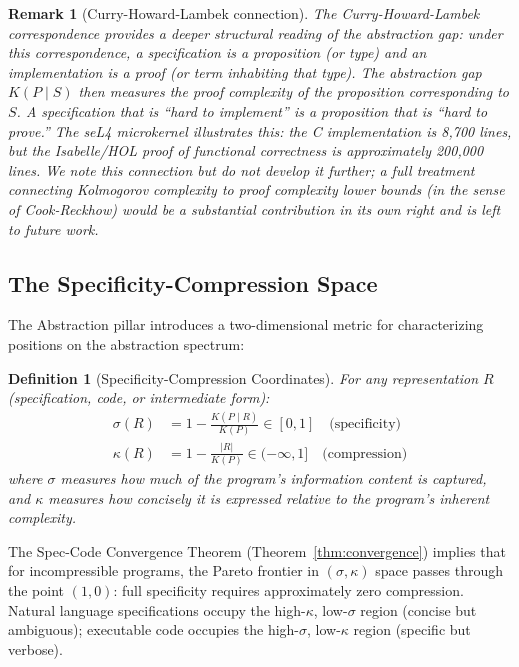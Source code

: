 \documentclass[11pt, a4paper]{googledeepmind}
\newtheorem{definition}{Definition}[section]
\newtheorem*{remark}{Remark}
\begin{document}
\begin{remark}[Curry-Howard-Lambek connection]
The Curry-Howard-Lambek correspondence \citep{martinlof1979constructive, wadler2015propositions, lambek1986higher} provides a deeper structural reading of the abstraction gap: under this correspondence, a specification is a proposition (or type) and an implementation is a proof (or term inhabiting that type). The abstraction gap $K(P \mid S)$ then measures the proof complexity of the proposition corresponding to $S$. A specification that is ``hard to implement'' is a proposition that is ``hard to prove.'' The seL4 microkernel illustrates this: the C implementation is 8,700 lines, but the Isabelle/HOL proof of functional correctness is approximately 200,000 lines. We note this connection but do not develop it further; a full treatment connecting Kolmogorov complexity to proof complexity lower bounds (in the sense of Cook-Reckhow) would be a substantial contribution in its own right and is left to future work.
\end{remark}

\subsection{The Specificity-Compression Space}

The Abstraction pillar introduces a two-dimensional metric for characterizing positions on the abstraction spectrum:

\begin{definition}[Specificity-Compression Coordinates]
\label{def:sigma-kappa}
For any representation $R$ (specification, code, or intermediate form):
\begin{align}
    \sigma(R) &= 1 - \frac{K(P \mid R)}{K(P)} \in [0, 1] \quad \text{(specificity)} \\
    \kappa(R) &= 1 - \frac{|R|}{K(P)} \in (-\infty, 1] \quad \text{(compression)}
\end{align}
where $\sigma$ measures how much of the program's information content is captured, and $\kappa$ measures how concisely it is expressed relative to the program's inherent complexity.
\end{definition}

The Spec-Code Convergence Theorem (Theorem~\ref{thm:convergence}) implies that for incompressible programs, the Pareto frontier in $(\sigma, \kappa)$ space passes through the point $(1, 0)$: full specificity requires approximately zero compression. Natural language specifications occupy the high-$\kappa$, low-$\sigma$ region (concise but ambiguous); executable code occupies the high-$\sigma$, low-$\kappa$ region (specific but verbose).
\end{document}
